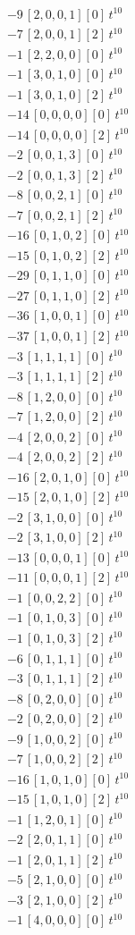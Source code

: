 \begin{align*}
-9\,[2,0,0,1] [0]\,t^{10} \\
-7\,[2,0,0,1] [2]\,t^{10} \\
-1\,[2,2,0,0] [0]\,t^{10} \\
-1\,[3,0,1,0] [0]\,t^{10} \\
-1\,[3,0,1,0] [2]\,t^{10} \\
-14\,[0,0,0,0] [0]\,t^{10} \\
-14\,[0,0,0,0] [2]\,t^{10} \\
-2\,[0,0,1,3] [0]\,t^{10} \\
-2\,[0,0,1,3] [2]\,t^{10} \\
-8\,[0,0,2,1] [0]\,t^{10} \\
-7\,[0,0,2,1] [2]\,t^{10} \\
-16\,[0,1,0,2] [0]\,t^{10} \\
-15\,[0,1,0,2] [2]\,t^{10} \\
-29\,[0,1,1,0] [0]\,t^{10} \\
-27\,[0,1,1,0] [2]\,t^{10} \\
-36\,[1,0,0,1] [0]\,t^{10} \\
-37\,[1,0,0,1] [2]\,t^{10} \\
-3\,[1,1,1,1] [0]\,t^{10} \\
-3\,[1,1,1,1] [2]\,t^{10} \\
-8\,[1,2,0,0] [0]\,t^{10} \\
-7\,[1,2,0,0] [2]\,t^{10} \\
-4\,[2,0,0,2] [0]\,t^{10} \\
-4\,[2,0,0,2] [2]\,t^{10} \\
-16\,[2,0,1,0] [0]\,t^{10} \\
-15\,[2,0,1,0] [2]\,t^{10} \\
-2\,[3,1,0,0] [0]\,t^{10} \\
-2\,[3,1,0,0] [2]\,t^{10} \\
-13\,[0,0,0,1] [0]\,t^{10} \\
-11\,[0,0,0,1] [2]\,t^{10} \\
-1\,[0,0,2,2] [0]\,t^{10} \\
-1\,[0,1,0,3] [0]\,t^{10} \\
-1\,[0,1,0,3] [2]\,t^{10} \\
-6\,[0,1,1,1] [0]\,t^{10} \\
-3\,[0,1,1,1] [2]\,t^{10} \\
-8\,[0,2,0,0] [0]\,t^{10} \\
-2\,[0,2,0,0] [2]\,t^{10} \\
-9\,[1,0,0,2] [0]\,t^{10} \\
-7\,[1,0,0,2] [2]\,t^{10} \\
-16\,[1,0,1,0] [0]\,t^{10} \\
-15\,[1,0,1,0] [2]\,t^{10} \\
-1\,[1,2,0,1] [0]\,t^{10} \\
-2\,[2,0,1,1] [0]\,t^{10} \\
-1\,[2,0,1,1] [2]\,t^{10} \\
-5\,[2,1,0,0] [0]\,t^{10} \\
-3\,[2,1,0,0] [2]\,t^{10} \\
-1\,[4,0,0,0] [0]\,t^{10}
\end{align*}
